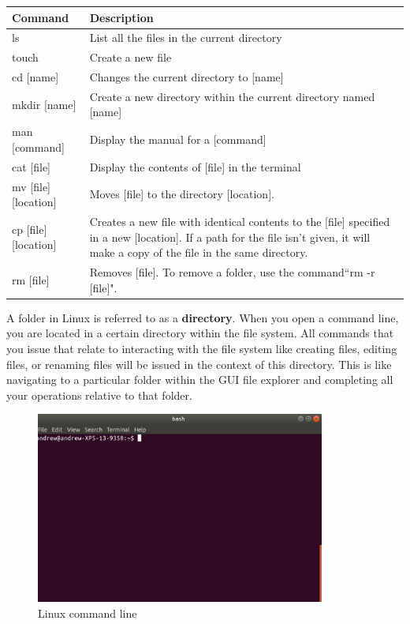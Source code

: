 \begin{center}
    \begin{tabular}{| l | p{75mm} | }
      \hline
      Command & Description \\ \hline
      ls & List all the files in the current directory \\ \hline
      touch & Create a new file \\ \hline
      cd [name] & Changes the current directory to [name] \\ \hline
      mkdir [name] & Create a new directory within the current directory named [name] \\ \hline
      man [command] & Display the manual for a [command] \\ \hline
      cat [file] & Display the contents of [file] in the terminal \\ \hline
      mv [file] [location] & Moves [file] to the directory [location]. \\ \hline 
      cp [file] [location] & Creates a new file with identical contents to the [file] specified in a new [location]. If a path for the file isn’t given, it will make a copy of the file in the same directory. \\ \hline
      rm [file] & Removes [file]. To remove a folder, use the command``rm -r [file]". \\ \hline
    \end{tabular}
\end{center}
  
  A folder in Linux is referred to as a \textbf{directory}. When you open a command line, you are located in a certain directory within the file system. All commands that you issue that relate to interacting with the file system like creating files, editing files, or renaming files will be issued in the context of this directory. This is like navigating to a particular folder within the GUI file explorer and completing all your operations relative to that folder.

\begin{figure}
	\centering
	\includegraphics[width=0.85\textwidth]{images/commandLineOne.png}
	\caption{Linux command line}
	\label{fig:linux:one}
\end{figure}

